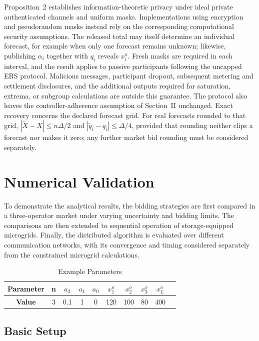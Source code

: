 \documentclass[journal]{IEEEtran}
\begin{document}
Proposition~2 establishes information-theoretic privacy under ideal private authenticated channels and uniform masks. Implementations using encryption and pseudorandom masks instead rely on the corresponding computational security assumptions. The released total may itself determine an individual forecast, for example when only one forecast remains unknown; likewise, publishing $\alpha_i$ together with $q_i$ reveals $x_i^o$. Fresh masks are required in each interval, and the result applies to passive participants following the uncapped ERS protocol. Malicious messages, participant dropout, subsequent metering and settlement disclosures, and the additional outputs required for saturation, extrema, or subgroup calculations are outside this guarantee. The protocol also leaves the controller-adherence assumption of Section~II unchanged. Exact recovery concerns the declared forecast grid. For real forecasts rounded to that grid, $|\widetilde X-X|\leq n\Delta/2$ and $|\widetilde q_i-q_i|\leq\Delta/4$, provided that rounding neither clips a forecast nor makes it zero; any further market bid rounding must be considered separately.

\section{Numerical Validation \label{sec:examples}}

To demonstrate the analytical results, the bidding strategies are first compared in a three-operator market under varying uncertainty and bidding limits. The comparisons are then extended to sequential operation of storage-equipped microgrids. Finally, the distributed algorithm is evaluated over different communication networks, with its convergence and timing considered separately from the constrained microgrid calculations.

\begin{table}[hbt!]
\centering
\vspace*{-0.1in}
\caption{Example Parameters}
\label{tab:example_params}
\begin{tabular}{|c||c||c|c|c||c|c|c||c|c|}
\hline
\textbf{Parameter} & n & $a_2$ & $a_1$ & $a_0$ & $x_1^o$ & $x_2^o$ & $x_3^o$ & $x_L^o$ \\ \hline
\textbf{Value} &  $3$ &  0.1 & 1 & 0 & 120 & 100 & 80 & 400 \\
\hline
\end{tabular}
\end{table}

\subsection{Basic Setup}
\end{document}
